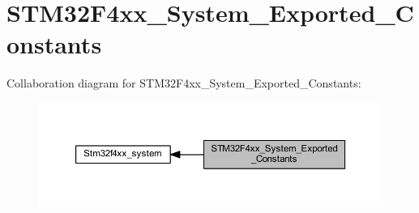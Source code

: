 \hypertarget{group___s_t_m32_f4xx___system___exported___constants}{}\section{S\+T\+M32\+F4xx\+\_\+\+System\+\_\+\+Exported\+\_\+\+Constants}
\label{group___s_t_m32_f4xx___system___exported___constants}
Collaboration diagram for S\+T\+M32\+F4xx\+\_\+\+System\+\_\+\+Exported\+\_\+\+Constants\+:
\nopagebreak
\begin{figure}[H]
\begin{center}
\leavevmode
\includegraphics[width=350pt]{group___s_t_m32_f4xx___system___exported___constants}
\end{center}
\end{figure}
